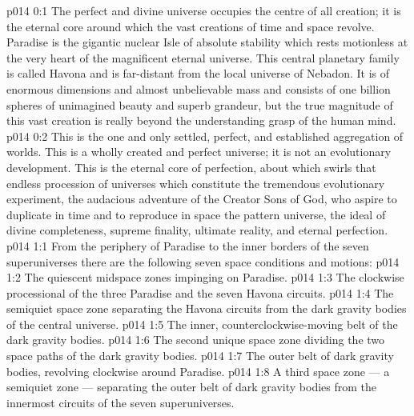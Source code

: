 \author{Perfector of Wisdom}
\vs p014 0:1 The perfect and divine universe occupies the centre of all creation; it is the eternal core around which the vast creations of time and space revolve. Paradise is the gigantic nuclear Isle of absolute stability which rests motionless at the very heart of the magnificent eternal universe. This central planetary family is called Havona and is far\hyp{}distant from the local universe of Nebadon. It is of enormous dimensions and almost unbelievable mass and consists of one billion spheres of unimagined beauty and superb grandeur, but the true magnitude of this vast creation is really beyond the understanding grasp of the human mind.
\vs p014 0:2 This is the one and only settled, perfect, and established aggregation of worlds. This is a wholly created and perfect universe; it is not an evolutionary development. This is the eternal core of perfection, about which swirls that endless procession of universes which constitute the tremendous evolutionary experiment, the audacious adventure of the Creator Sons of God, who aspire to duplicate in time and to reproduce in space the pattern universe, the ideal of divine completeness, supreme finality, ultimate reality, and eternal perfection.
\vs p014 1:1 From the periphery of Paradise to the inner borders of the seven superuniverses there are the following seven space conditions and motions:
\vs p014 1:2 \bibnobreakspace The quiescent midspace zones impinging on Paradise.
\vs p014 1:3 \bibnobreakspace The clockwise processional of the three Paradise and the seven Havona circuits.
\vs p014 1:4 \bibnobreakspace The semiquiet space zone separating the Havona circuits from the dark gravity bodies of the central universe.
\vs p014 1:5 \bibnobreakspace The inner, counterclockwise\hyp{}moving belt of the dark gravity bodies.
\vs p014 1:6 \bibnobreakspace The second unique space zone dividing the two space paths of the dark gravity bodies.
\vs p014 1:7 \bibnobreakspace The outer belt of dark gravity bodies, revolving clockwise around Paradise.
\vs p014 1:8 \bibnobreakspace A third space zone --- a semiquiet zone --- separating the outer belt of dark gravity bodies from the innermost circuits of the seven superuniverses.
